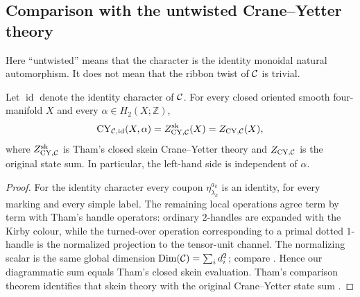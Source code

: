 \subsection{Comparison with the untwisted Crane--Yetter theory}
\label{subsec:untwisted-comparison}

Here ``untwisted'' means that the character is the identity monoidal natural
automorphism.  It does not mean that the ribbon twist of $\mathcal{C}$ is trivial.

\begin{theorem}
\label{thm:untwisted-comparison}
Let $\operatorname{id}$ denote the identity character of $\mathcal{C}$.  For every
closed oriented smooth four-manifold $X$ and every
$\alpha\in H_2(X;\mathbb Z)$,
\[
  \operatorname{CY}_{\mathcal{C},\operatorname{id}}(X,\alpha)
  =Z^{\mathrm{sk}}_{\mathrm{CY},\mathcal{C}}(X)
  =Z_{\mathrm{CY},\mathcal{C}}(X),
\]
where $Z^{\mathrm{sk}}_{\mathrm{CY},\mathcal{C}}$ is Tham's closed skein
Crane--Yetter theory and $Z_{\mathrm{CY},\mathcal{C}}$ is the original state sum.
In particular, the left-hand side is independent of $\alpha$.
\end{theorem}

\begin{proof}
For the identity character every coupon
$\eta_{\lambda_k}^{a_k}$ is an identity, for every marking and every simple
label.  The remaining local operations agree term by term with Tham's
handle operators: ordinary $2$-handles are expanded with the Kirby colour,
while the turned-over operation corresponding to a primal dotted
$1$-handle is the normalized projection to the tensor-unit channel.  The
normalizing scalar is the same global dimension
$\operatorname{Dim}(\mathcal{C})=\sum_i d_i^2$; compare
\cite[Equation~(2.3), Definition~5.11, and the handle calculation on
pp.~99--101]{Tham2021}.  Hence our diagrammatic sum equals Tham's closed
skein evaluation.  Tham's comparison theorem identifies that skein theory
with the original Crane--Yetter state sum
\cite[Theorem~3.61]{Tham2021}.
\end{proof}
